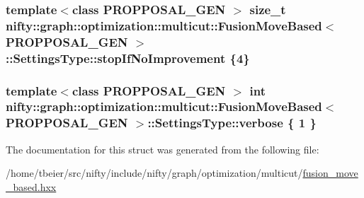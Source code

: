 \subsubsection[{stop\+If\+No\+Improvement}]{\setlength{\rightskip}{0pt plus 5cm}template$<$class P\+R\+O\+P\+P\+O\+S\+A\+L\+\_\+\+G\+E\+N $>$ size\+\_\+t {\bf nifty\+::graph\+::optimization\+::multicut\+::\+Fusion\+Move\+Based}$<$ P\+R\+O\+P\+P\+O\+S\+A\+L\+\_\+\+G\+E\+N $>$\+::Settings\+Type\+::stop\+If\+No\+Improvement \{4\}}\label{structnifty_1_1graph_1_1optimization_1_1multicut_1_1FusionMoveBased_1_1SettingsType_a7c89d3f9a95bc7bb00c6fdb5b130366c}
\hypertarget{structnifty_1_1graph_1_1optimization_1_1multicut_1_1FusionMoveBased_1_1SettingsType_abbef0267b5a7dd3eb96da4eba8f11cc9}{}
\subsubsection[{verbose}]{\setlength{\rightskip}{0pt plus 5cm}template$<$class P\+R\+O\+P\+P\+O\+S\+A\+L\+\_\+\+G\+E\+N $>$ int {\bf nifty\+::graph\+::optimization\+::multicut\+::\+Fusion\+Move\+Based}$<$ P\+R\+O\+P\+P\+O\+S\+A\+L\+\_\+\+G\+E\+N $>$\+::Settings\+Type\+::verbose \{ 1 \}}\label{structnifty_1_1graph_1_1optimization_1_1multicut_1_1FusionMoveBased_1_1SettingsType_abbef0267b5a7dd3eb96da4eba8f11cc9}


The documentation for this struct was generated from the following file\+:\begin{DoxyCompactItemize}
\item 
/home/tbeier/src/nifty/include/nifty/graph/optimization/multicut/\hyperlink{multicut_2fusion__move__based_8hxx}{fusion\+\_\+move\+\_\+based.\+hxx}\end{DoxyCompactItemize}
